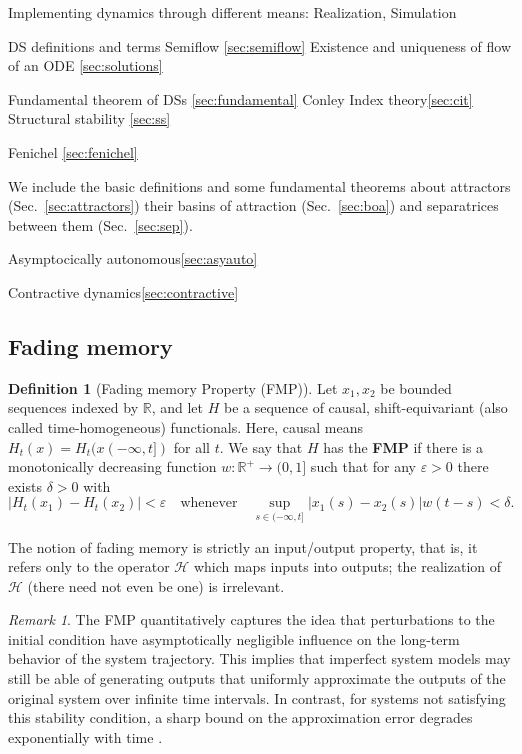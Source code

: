 \documentclass{article}
\theoremstyle{definition} \newtheorem{definition}{Definition}
\theoremstyle{remark} \newtheorem{remark}{Remark}
\newcounter{ct}
\begin{document}
Implementing dynamics through different means: Realization\label{sec:realization}, Simulation\label{sec:simulation}

DS definitions and terms 
Semiflow \ref{sec:semiflow}
Existence and uniqueness of flow of an ODE \ref{sec:solutions}

Fundamental theorem of DSs \ref{sec:fundamental}
Conley Index theory\ref{sec:cit}
Structural stability \ref{sec:ss}

Fenichel \ref{sec:fenichel}

We include the basic definitions and some fundamental theorems about attractors (Sec.~\ref{sec:attractors})
their basins of attraction (Sec.~\ref{sec:boa}) and separatrices between them (Sec.~\ref{sec:sep}).

Asymptocically autonomous\ref{sec:asyauto}

Contractive dynamics\ref{sec:contractive}



\subsection{Fading memory}\label{sec:fading_memory}

\begin{definition}[Fading memory Property (FMP)]\label{def:fmp}
Let $x_1, x_2$ be bounded sequences indexed by $\mathbb{R}$, and let $H$ be a sequence of causal, shift-equivariant (also called time-homogeneous) functionals.
Here, causal means $H_t(x) = H_t(x(-\infty,t])$ for all $t$.
We say that $H$ has the \textbf{FMP} if there is a monotonically decreasing function $w : \mathbb{R}^+ \to (0, 1]$ such that for any $\varepsilon > 0$ there exists $\delta > 0$ with 
\[
|H_t(x_1) - H_t(x_2)| < \varepsilon \quad \text{whenever} \quad \sup_{s \in (-\infty, t]} |x_1(s) - x_2(s)| w(t - s) < \delta.
\]
\end{definition}
The notion of fading memory is strictly an input/output property, that is, it refers only to the operator $\mathcal{H}$ which maps inputs into outputs; the realization of $\mathcal{H}$ (there need not even be one) is irrelevant.

\begin{remark}\label{rem:fmp}%
The FMP quantitatively captures the idea that perturbations to the initial condition have asymptotically negligible influence on the long-term behavior of the system trajectory.
This implies that imperfect system models may still be able of generating outputs that uniformly approximate the outputs of the original system over infinite time intervals.
In contrast, for systems not satisfying this stability condition, a sharp bound on the approximation error degrades exponentially with time \citep{hirsch1974nonautonomous, sontag2013mathematical}.
\end{remark}
\end{document}
